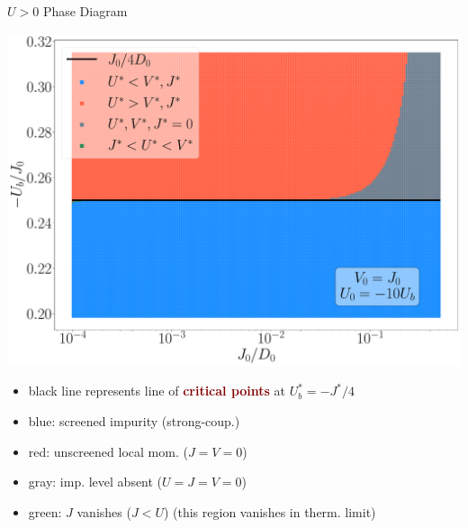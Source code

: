 \documentclass[aspectratio=169]{beamer}
\newcommand{\focus}[1]{\textcolor{maroon}{\textbf{#1}}}
\begin{document}
\begin{frame}[noframenumbering]{\(U > 0\) Phase Diagram}
\hspace*{-20pt}
\begin{minipage}{0.5\textwidth}
\includegraphics[width=\textwidth]{./figures/phase-map-MIT.pdf}
\end{minipage}
\begin{minipage}{0.53\textwidth}
	\begin{itemize}
	\item black line represents line of \focus{critical points} at \(U_b^* = -J^*/4\)
	\item blue: screened impurity (strong-coup.)\\[10pt]
	\item red: unscreened local mom. (\(J=V=0\))\\[10pt]
	\item gray: imp. level absent (\(U=J=V=0\))\\[10pt]
	\item green: \(J\) vanishes (\(J < U\)) (this region vanishes in therm. limit)
	\end{itemize}
\end{minipage}


\end{frame}
\end{document}
